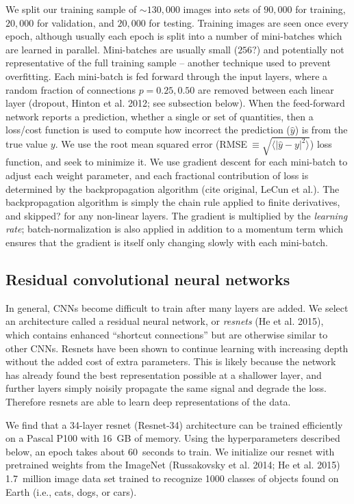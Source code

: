 \documentclass[fleqn,usenatbib]{mnras}
\begin{document}
We split our training sample of $\sim 130,000$ images into sets of $90,000$ for training, $20,000$ for validation, and $20,000$ for testing.
Training images are seen once every epoch, although usually each epoch is split into a number of mini-batches which are learned in parallel.
Mini-batches are usually small ($256?$) and potentially not representative of the full training sample -- another technique used to prevent overfitting.
Each mini-batch is fed forward through the input layers, where a random fraction of connections $p=0.25, 0.50$ are removed between each linear layer (dropout, Hinton et al. 2012; see subsection below).
When the feed-forward network reports a prediction, whether a single or set of quantities, then a loss/cost function is used to compute how incorrect the prediction ($\hat y$) is from the true value $y$.
We use the root mean squared error (RMSE$~\equiv \sqrt{\langle |\hat y - y|^2\rangle}$) loss function, and seek to minimize it.
We use gradient descent for each mini-batch to adjust each weight parameter, and each fractional contribution of loss is determined by the backpropagation algorithm (cite original, LeCun et al.).
The backpropagation algorithm is simply the chain rule applied to finite derivatives, and skipped? for any non-linear layers.
The gradient is multiplied by the \textit{learning rate}; batch-normalization is also applied in addition to a momentum term which ensures that the gradient is itself only changing slowly with each mini-batch.


\subsection{Residual convolutional neural networks}
In general, CNNs become difficult to train after many layers are added.
We select an architecture called a residual neural network, or \textit{resnets} (He et al. 2015), which contains enhanced ``shortcut connections'' but are otherwise similar to other CNNs.
Resnets have been shown to continue learning with increasing depth without the added cost of extra parameters.
This is likely because the network has already found the best representation possible at a shallower layer, and further layers simply noisily propagate the same signal and degrade the loss.
Therefore resnets are able to learn deep representations of the data.

We find that a 34-layer resnet (Resnet-34) architecture can be trained efficiently on a Pascal P100 with 16~GB of memory.
Using the hyperparameters described below, an epoch takes about 60~seconds to train.
We initialize our resnet with pretrained weights from the ImageNet (Russakovsky et al. 2014; He et al. 2015) 1.7~million image data set trained to recognize 1000 classes of objects found on Earth (i.e., cats, dogs, or cars).
\end{document}
